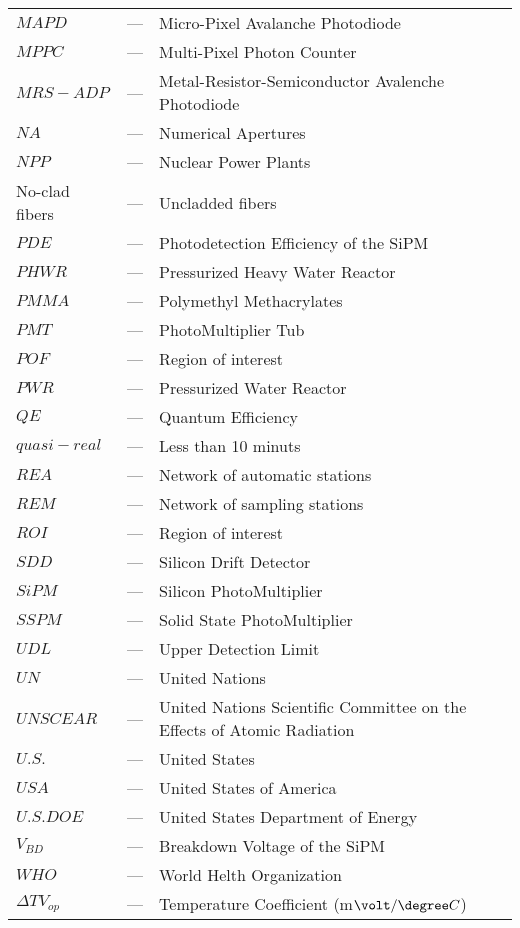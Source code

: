 \begin{longtable}{p{25mm} c p{120mm} }
$MAPD$ & --- & Micro-Pixel Avalanche Photodiode\\
$MPPC$ & --- & Multi-Pixel Photon Counter\\
$MRS-ADP$ & --- & Metal-Resistor-Semiconductor Avalenche Photodiode\\
$NA$ & --- & Numerical Apertures\\
$NPP$ & --- & Nuclear Power Plants\\
No-clad fibers & --- & Uncladded fibers\\
$PDE$ & --- & Photodetection Efficiency of the SiPM\\
$PHWR$ & --- & Pressurized Heavy Water Reactor\\
$PMMA$ & --- & Polymethyl Methacrylates\\
$PMT$ & --- & PhotoMultiplier Tub\\
$POF$ & --- & Region of interest\\
$PWR$ & --- & Pressurized Water Reactor\\
$QE$ & --- & Quantum Efficiency\\
$quasi-real$ & --- & Less than 10 minuts\\
$REA$ & --- & Network of automatic stations\\
$REM$ & --- & Network of sampling stations\\
$ROI$ & --- & Region of interest\\
$SDD$ & --- & Silicon Drift Detector\\
$SiPM$ & --- & Silicon PhotoMultiplier\\
$SSPM$ & --- & Solid State PhotoMultiplier\\
$UDL$ & --- & Upper Detection Limit\\
$UN$ & --- & United Nations\\
$UNSCEAR$ & --- & United Nations Scientific Committee on the Effects of Atomic Radiation\\
$U.S.$ & --- & United States\\
$USA$ & --- & United States of America\\
$U.S. DOE$ & --- & United States Department of Energy\\
$V_{BD}$ & --- & Breakdown Voltage of the SiPM\\
$WHO$ & --- & World Helth Organization\\
$\Delta TV_{op}$ & --- & Temperature Coefficient (m$\volt/\degree C$)\\


\end{longtable}
